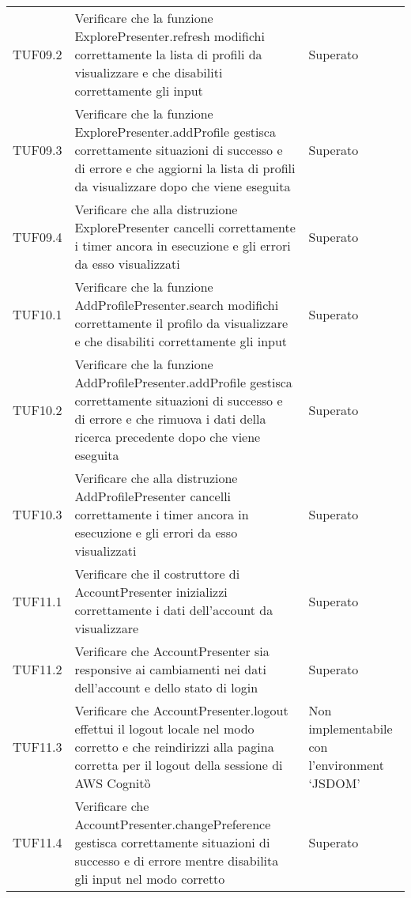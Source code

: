 {\begin{longtable}{C{.3\freewidth} C{.5\freewidth} C{.3\freewidth}}
        TUF09.2 & Verificare che la funzione ExplorePresenter.refresh modifichi correttamente la lista di profili da visualizzare 
                e che disabiliti correttamente gli input & Superato \\

        TUF09.3 & Verificare che la funzione ExplorePresenter.addProfile gestisca correttamente situazioni di successo 
                e di errore e che aggiorni la lista di profili da visualizzare dopo che viene eseguita & Superato \\

        TUF09.4 & Verificare che alla distruzione ExplorePresenter cancelli correttamente i timer ancora in esecuzione 
                e gli errori da esso visualizzati & Superato \\

        TUF10.1 & Verificare che la funzione AddProfilePresenter.search modifichi correttamente il profilo da visualizzare 
                e che disabiliti correttamente gli input & Superato \\

        TUF10.2 & Verificare che la funzione AddProfilePresenter.addProfile gestisca correttamente situazioni di successo 
                e di errore e che rimuova i dati della ricerca precedente dopo che viene eseguita & Superato \\

        TUF10.3 & Verificare che alla distruzione AddProfilePresenter cancelli correttamente i timer ancora in esecuzione 
                e gli errori da esso visualizzati & Superato \\

        TUF11.1 & Verificare che il costruttore di AccountPresenter inizializzi correttamente i dati dell'account da visualizzare & Superato \\

        TUF11.2 & Verificare che AccountPresenter sia responsive ai cambiamenti nei dati dell'account e dello stato di login & Superato \\

        TUF11.3 & Verificare che AccountPresenter.logout effettui il logout locale nel modo corretto 
                e che reindirizzi alla pagina corretta per il logout della sessione di AWS Cognito\G{} & Non implementabile con l'environment `JSDOM' \\

        TUF11.4 & Verificare che AccountPresenter.changePreference gestisca correttamente situazioni di successo 
                e di errore mentre disabilita gli input nel modo corretto & Superato \\


\end{longtable}}
